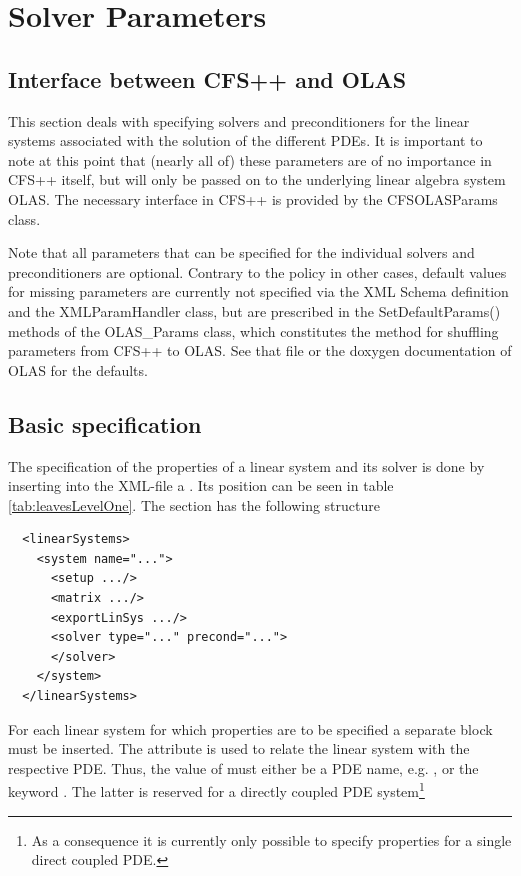 %
%
\chapter{Solver Parameters}
%
%
\section{Interface between CFS++ and OLAS}
\label{sec:SP_Interface}
%
%
This section deals with specifying solvers and preconditioners for the linear
systems associated with the solution of the different PDEs. It is important to
note at this point that (nearly all of) these parameters are of no importance
in CFS++ itself, but will only be passed on to the underlying linear algebra
system OLAS. The necessary interface in CFS++ is provided by the CFSOLASParams
class.

Note that all parameters that can be specified for the individual solvers and
preconditioners are optional. Contrary to the policy in other cases,
default values for missing parameters are currently not specified via the XML
Schema definition and the XMLParamHandler class, but are prescribed in the
SetDefaultParams() methods of the OLAS\_Params class, which constitutes the
method for shuffling parameters from CFS++ to OLAS. See that file or the
doxygen documentation of OLAS for the defaults.
%
%
\section{Basic specification}
%
%
The specification of the properties of a linear system and its solver is
done by inserting into the XML-file a . Its position can be
seen in table \ref{tab:leavesLevelOne}. The  section has
the following structure
%
%
\begin{verbatim}
  <linearSystems>
    <system name="...">
      <setup .../>
      <matrix .../>
      <exportLinSys .../>
      <solver type="..." precond="...">
      </solver>
    </system>
  </linearSystems>
\end{verbatim}
%
%
For each linear system for which properties are to be specified a separate
 block must be inserted. The  attribute is used to
relate the linear system with the respective PDE. Thus, the value of 
must either be a PDE name, e.g. , or the keyword .
The latter is reserved for a directly coupled PDE system\footnote{As a
consequence it is currently only possible to specify properties for a single
direct coupled PDE.}


